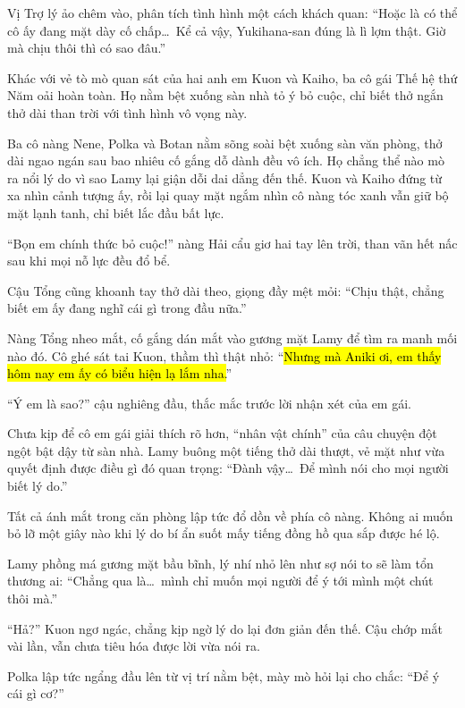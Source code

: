\documentclass[../main.tex]{subfiles}
\begin{document}
Vị Trợ lý ảo chêm vào, phân tích tình hình một cách khách quan: ``Hoặc là có thể cô ấy đang mặt dày cố chấp\dots\ Kể cả vậy, Yukihana-san đúng là lì lợm thật. Giờ mà chịu thôi thì có sao đâu.''

Khác với vẻ tò mò quan sát của hai anh em Kuon và Kaiho, ba cô gái Thế hệ thứ Năm oải hoàn toàn. Họ nằm bệt xuống sàn nhà tỏ ý bỏ cuộc, chỉ biết thở ngắn thở dài than trời với tình hình vô vọng này.

\ct

Ba cô nàng Nene, Polka và Botan nằm sõng soài bệt xuống sàn văn phòng, thở dài ngao ngán sau bao nhiêu cố gắng dỗ dành đều vô ích. Họ chẳng thể nào mò ra nổi lý do vì sao Lamy lại giận dỗi dai dẳng đến thế. Kuon và Kaiho đứng từ xa nhìn cảnh tượng ấy, rồi lại quay mặt ngắm nhìn cô nàng tóc xanh vẫn giữ bộ mặt lạnh tanh, chỉ biết lắc đầu bất lực.


``Bọn em chính thức bỏ cuộc!'' nàng Hải cẩu giơ hai tay lên trời, than vãn hết nấc sau khi mọi nỗ lực đều đổ bể.

Cậu Tổng cũng khoanh tay thở dài theo, giọng đầy mệt mỏi: ``Chịu thật, chẳng biết em ấy đang nghĩ cái gì trong đầu nữa.''

Nàng Tổng nheo mắt, cố gắng dán mắt vào gương mặt Lamy để tìm ra manh mối nào đó. Cô ghé sát tai Kuon, thầm thì thật nhỏ: ``\hl{Nhưng mà Aniki ơi, em thấy hôm nay em ấy có biểu hiện lạ lắm nha.}''

``Ý em là sao?'' cậu nghiêng đầu, thắc mắc trước lời nhận xét của em gái.

Chưa kịp để cô em gái giải thích rõ hơn, ``nhân vật chính'' của câu chuyện đột ngột bật dậy từ sàn nhà. Lamy buông một tiếng thở dài thượt, vẻ mặt như vừa quyết định được điều gì đó quan trọng: ``Đành vậy\dots\ Để mình nói cho mọi người biết lý do.''

Tất cả ánh mắt trong căn phòng lập tức đổ dồn về phía cô nàng. Không ai muốn bỏ lỡ một giây nào khi lý do bí ẩn suốt mấy tiếng đồng hồ qua sắp được hé lộ.

Lamy phồng má gương mặt bầu bĩnh, lý nhí nhỏ lên như sợ nói to sẽ làm tổn thương ai: ``Chẳng qua là\dots\ mình chỉ muốn mọi người để ý tới mình một chút thôi mà.''

``Hả?'' Kuon ngơ ngác, chẳng kịp ngờ lý do lại đơn giản đến thế. Cậu chớp mắt vài lần, vẫn chưa tiêu hóa được lời vừa nói ra.

Polka lập tức ngẩng đầu lên từ vị trí nằm bệt, mày mò hỏi lại cho chắc: ``Để ý cái gì cơ?''
\end{document}
